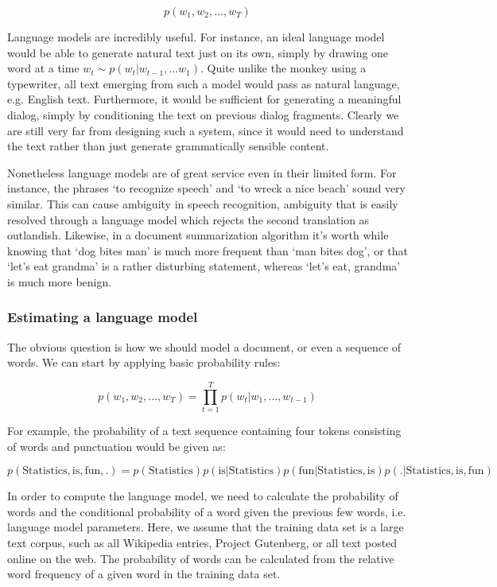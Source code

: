 $$p(w_1, w_2, \ldots, w_T)$$

Language models are incredibly useful. For instance, an ideal language model would be able to generate natural text just on its own, simply by drawing one word at a time $w_t \sim p(w_t|w_{t-1}, \ldots w_1)$. Quite unlike the monkey using a typewriter, all text emerging from such a model would pass as natural language, e.g. English text. Furthermore, it would be sufficient for generating a meaningful dialog, simply by conditioning the text on previous dialog fragments. Clearly we are still very far from designing such a system, since it would need to understand the text rather than just generate grammatically sensible content.

Nonetheless language models are of great service even in their limited form. For instance, the phrases ‘to recognize speech’ and ‘to wreck a nice beach’ sound very similar. This can cause ambiguity in speech recognition, ambiguity that is easily resolved through a language model which rejects the second translation as outlandish. Likewise, in a document summarization algorithm it’s worth while knowing that ‘dog bites man’ is much more frequent than ‘man bites dog’, or that ‘let’s eat grandma’ is a rather disturbing statement, whereas ‘let’s eat, grandma’ is much more benign.

\subsubsection{Estimating a language model}

The obvious question is how we should model a document, or even a sequence of words. We can start by applying basic probability rules:

$$p(w_1, w_2, \ldots, w_T) = \prod_{t=1}^T p(w_t | w_1, \ldots, w_{t-1})$$

For example, the probability of a text sequence containing four tokens consisting of words and punctuation would be given as:

$$p(\mathrm{Statistics}, \mathrm{is},  \mathrm{fun}, \mathrm{.}) =  p(\mathrm{Statistics}) p(\mathrm{is} | \mathrm{Statistics}) p(\mathrm{fun} | \mathrm{Statistics}, \mathrm{is}) p(\mathrm{.} | \mathrm{Statistics}, \mathrm{is}, \mathrm{fun})$$

In order to compute the language model, we need to calculate the probability of words and the conditional probability of a word given the previous few words, i.e. language model parameters. Here, we assume that the training data set is a large text corpus, such as all Wikipedia entries, Project Gutenberg, or all text posted online on the web. The probability of words can be calculated from the relative word frequency of a given word in the training data set.

